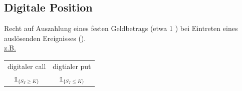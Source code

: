 \subsection{Digitale Position}
\label{sub: digitale_position}
Recht auf Auszahlung eines festen Geldbetrags (etwa 1 \texteuro) bei Eintreten eines auslösenden Ereignisses ().\\
\uline{z.B.}\\
\begin{tabular}{c c}
	digitaler call & digtialer put\\
	$\mathbb{1}_{\{S_T\ge K\}}$ & $\mathbb{1}_{\{S_T\le K \}}$ \\
\end{tabular}



